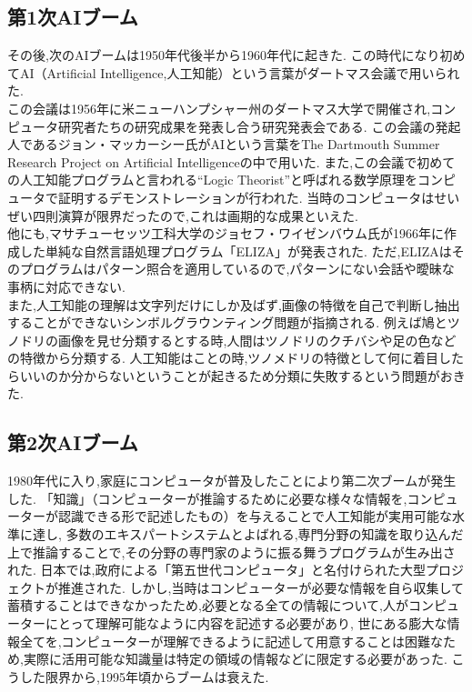\subsection{第1次AIブーム}
その後,次のAIブームは1950年代後半から1960年代に起きた.
この時代になり初めてAI（Artificial Intelligence,人工知能）という言葉がダートマス会議で用いられた.\\
この会議は1956年に米ニューハンプシャー州のダートマス大学で開催され,コンピュータ研究者たちの研究成果を発表し合う研究発表会である.\cite{webpage4}
この会議の発起人であるジョン・マッカーシー氏がAIという言葉をThe Dartmouth Summer Research Project on Artificial Intelligence\cite{ronbun2}の中で用いた.
また,この会議で初めての人工知能プログラムと言われる“Logic Theorist”と呼ばれる数学原理をコンピュータで証明するデモンストレーションが行われた.
当時のコンピュータはせいぜい四則演算が限界だったので,これは画期的な成果といえた.\\
他にも,マサチューセッツ工科大学のジョセフ・ワイゼンバウム氏が1966年に作成した単純な自然言語処理プログラム「ELIZA」が発表された.
ただ,ELIZAはそのプログラムはパターン照合を適用しているので,パターンにない会話や曖昧な事柄に対応できない.\\
また,人工知能の理解は文字列だけにしか及ばず,画像の特徴を自己で判断し抽出することができないシンボルグラウンティング問題が指摘される.
例えば鳩とツノドリの画像を見せ分類するとする時,人間はツノドリのクチバシや足の色などの特徴から分類する.
人工知能はことの時,ツノメドリの特徴として何に着目したらいいのか分からないということが起きるため分類に失敗するという問題がおきた.
\subsection{第2次AIブーム}
1980年代に入り,家庭にコンピュータが普及したことにより第二次ブームが発生した.
「知識」（コンピューターが推論するために必要な様々な情報を,コンピューターが認識できる形で記述したもの）を与えることで人工知能が実用可能な水準に達し,
多数のエキスパートシステムとよばれる,専門分野の知識を取り込んだ上で推論することで,その分野の専門家のように振る舞うプログラムが生み出された.
日本では,政府による「第五世代コンピュータ」と名付けられた大型プロジェクトが推進された.
しかし,当時はコンピューターが必要な情報を自ら収集して蓄積することはできなかったため,必要となる全ての情報について,人がコンピューターにとって理解可能なように内容を記述する必要があり,
世にある膨大な情報全てを,コンピューターが理解できるように記述して用意することは困難なため,実際に活用可能な知識量は特定の領域の情報などに限定する必要があった.
こうした限界から,1995年頃からブームは衰えた.
